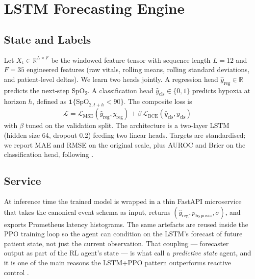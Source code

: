 \documentclass[conference]{IEEEtran}
\begin{document}
\section{LSTM Forecasting Engine}
\label{sec:lstm}

\subsection{State and Labels}
Let $X_t \in \mathbb{R}^{L\times F}$ be the windowed feature tensor with sequence length $L{=}12$ and $F{=}35$ engineered features (raw vitals, rolling means, rolling standard deviations, and patient-level deltas). We learn two heads jointly. A regression head $\hat{y}_{\text{reg}}\in\mathbb{R}$ predicts the next-step SpO\textsubscript{2}. A classification head $\hat{y}_{\text{cls}}\in\{0,1\}$ predicts hypoxia at horizon $h$, defined as $\mathbf{1}\{\text{SpO}_{2,t+h}<90\}$. The composite loss is
\[
  \mathcal{L} = \mathcal{L}_{\text{MSE}}(\hat{y}_{\text{reg}}, y_{\text{reg}}) + \beta\,\mathcal{L}_{\text{BCE}}(\hat{y}_{\text{cls}}, y_{\text{cls}})
\]
with $\beta$ tuned on the validation split. The architecture is a two-layer LSTM (hidden size 64, dropout 0.2) feeding two linear heads. Targets are standardised; we report MAE and RMSE on the original scale, plus AUROC and Brier on the classification head, following \cite{liu2024rl}.

\subsection{Service}
At inference time the trained model is wrapped in a thin FastAPI microservice that takes the canonical event schema as input, returns $(\hat{y}_{\text{reg}}, p_{\text{hypoxia}}, \sigma)$, and exports Prometheus latency histograms. The same artefacts are reused inside the PPO training loop so the agent can condition on the LSTM's forecast of future patient state, not just the current observation. That coupling --- forecaster output as part of the RL agent's state --- is what \cite{access2024_lstm_dt_ppo} call a \emph{predictive state} agent, and it is one of the main reasons the LSTM+PPO pattern outperforms reactive control \cite{liu2024rl}.

\end{document}
